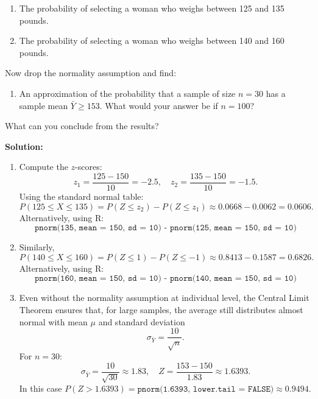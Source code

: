 \documentclass[12pt]{article}
\newif\ifsolutions
\begin{document}
\begin{enumerate}
    \begin{enumerate}
        \item[(a)] The probability of selecting a woman who weighs between 125 and 135 pounds.
        \item[(b)] The probability of selecting a woman who weighs between 140 and 160 pounds.
    \end{enumerate}

    Now drop the normality assumption and find:
    \begin{enumerate}
        \item[(c)] An approximation of the probability that a sample of size \( n = 30 \) has a sample mean \( \bar{Y} \geq 153 \). What would your answer be if \( n = 100 \)?
    \end{enumerate}

    What can you conclude from the results?

    \ifsolutions \color{blue} \textbf{Solution:} \\
    
    \begin{enumerate}[label=(\alph*)]
        \item Compute the $z$-scores:
        $$
        z_1 = \frac{125 - 150}{10} = -2.5, \quad z_2 = \frac{135 - 150}{10} = -1.5.
        $$
        Using the standard normal table:
        $$
        P(125 \leq X \leq 135) = P(Z \leq z_2) - P(Z \leq z_1) \approx 0.0668 - 0.0062 = 0.0606.
        $$
        Alternatively, using R:
        $$
        \texttt{pnorm(135, mean = 150, sd = 10) - pnorm(125, mean = 150, sd = 10)}
        $$
    
        \item Similarly,
        $$
        P(140 \leq X \leq 160) = P(Z \leq 1) - P(Z \leq -1) \approx 0.8413 - 0.1587 = 0.6826.
        $$
        Alternatively, using R:
        $$
        \texttt{pnorm(160, mean = 150, sd = 10) - pnorm(140, mean = 150, sd = 10)}
        $$
    
        \item Even without the normality assumption at individual level, the Central Limit Theorem ensures that, for large samples, the average still distributes almost normal with mean $\mu$ and standard deviation
        \[
        \sigma_{\bar{Y}} = \frac{10}{\sqrt{n}}.
        \]
        For \( n = 30 \):
        \[
        \sigma_{\bar{Y}} = \frac{10}{\sqrt{30}} \approx 1.83, \quad Z = \frac{153 - 150}{1.83} \approx 1.6393.
        \]
        In this case $P(Z > 1.6393) = \texttt{pnorm(1.6393, lower.tail = FALSE)} \approx 0.9494$.
        

\end{enumerate}
\end{enumerate}
\end{document}
